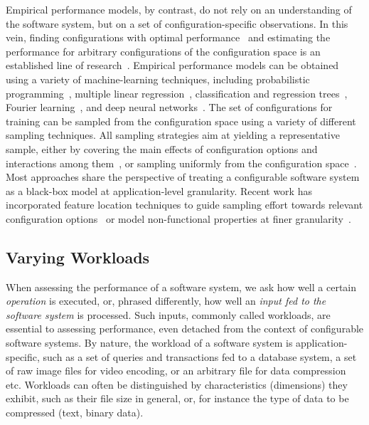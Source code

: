 Empirical performance models, by contrast, do not rely on an understanding of the software system, but on a set of configuration-specific observations. In this vein, finding configurations with optimal performance~\cite{nairUsingBadLearners2017,nairFlash18,ohFindingNearoptimalConfigurations2017} and estimating the performance for arbitrary configurations of the configuration space is an established line of research~\cite{siegmundPerformanceinfluenceModelsHighly2015,haDeepPerf2019,perfAL,guoVariabilityawarePerformancePrediction2013,sarkarCostEfficientSamplingPerformance,guo_2018_data,fourier_learning_2015,perLasso}.
Empirical performance models can be obtained using a variety of machine-learning techniques, including probabilistic programming~\cite{dorn2020}, multiple linear regression~\cite{siegmundPerformanceinfluenceModelsHighly2015}, classification and regression trees~\cite{sarkarCostEfficientSamplingPerformance,guo_2018_data}, Fourier learning~\cite{fourier_learning_2015,perLasso}, and deep neural networks~\cite{haDeepPerf2019,perfAL}.
The set of configurations for training can be sampled from the configuration space using a variety of different sampling techniques. All sampling strategies aim at yielding a representative sample, either by covering the main effects of configuration options and interactions among them~\cite{siegmundPredictingPerformanceAutomated2012}, or sampling uniformly from the configuration space~\cite{ohFindingNearoptimalConfigurations2017,kaltenecker_distance-based_2019}.
Most approaches share the perspective of treating a configurable software system as a black-box model at application-level granularity. Recent work has incorporated feature location techniques to guide sampling effort towards relevant configuration options~\cite{velez_2020_configcrusher_jase,velez_comprex_2021} or model non-functional properties at finer granularity~\cite{weber_white_2021}.

\subsection{Varying Workloads}
When assessing the performance of a software system, we ask how well a certain \textit{operation} is executed, or, phrased differently, how well an \textit{input fed to the software system} is processed. Such inputs, commonly called workloads, are essential to assessing performance, even detached from the context of configurable software systems. By nature, the workload of a software system is application-specific, such as a set of queries and transactions fed to a database system, a set of raw image files for video encoding, or an arbitrary file for data compression etc. Workloads can often be distinguished by characteristics (dimensions) they exhibit, such as their file size in general, or, for instance the  type of data to be compressed (text, binary data).

